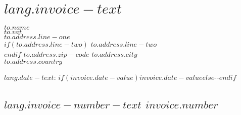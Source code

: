 \documentclass[$font-size$, a4paper, svgnames]{report}
\def\mydate{\leavevmode\hbox{\the\year-\the\month-\the\day}}
\begin{document}
\chapter{$lang.invoice-text$}

\normalsize \sffamily
\textsc{\textbf{$to.name$}}\\
$to.vat$\\[4pt]
$to.address.line-one$\\
$if(to.address.line-two)$
  $to.address.line-two$\\
$endif$
$to.address.zip-code$ $to.address.city$\\
$to.address.country$\\

\vspace{6em}

\begin{flushright}
  \small
  $lang.date-text$: $if(invoice.date-value)$$invoice.date-value$$else$\mydate$endif$
\end{flushright}

\vspace{1em}


\section*{\textbf{$lang.invoice-number-text$ $invoice.number$}}
\footnotesize
{}
\setcounter{pos}{0}
\end{document}
